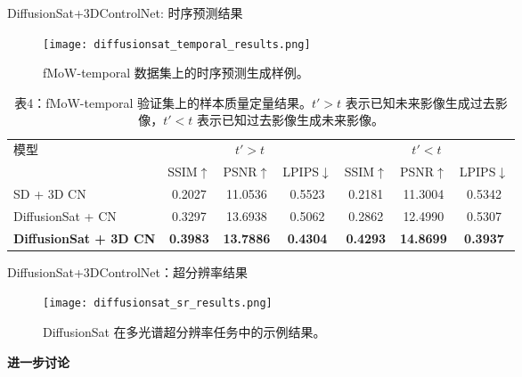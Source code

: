 \begin{refsection}
  \begin{frame}{DiffusionSat+3DControlNet: 时序预测结果}
    \begin{figure}
      \centering
      \texttt{[image: diffusionsat\_temporal\_results.png]}
      \caption[]{\scriptsize fMoW-temporal 数据集上的时序预测生成样例。~\parencite{diffusionset2024}}
    \end{figure}
    \begin{table}[h]
      \centering
      \scriptsize
      \begin{tabular}{l|ccc|ccc}
        \toprule
        \multirow{2}{*}{模型} & \multicolumn{3}{c|}{$t' > t$} & \multicolumn{3}{c}{$t' < t$} \\
        & SSIM$\uparrow$ & PSNR$\uparrow$ & LPIPS$\downarrow$ & SSIM$\uparrow$ & PSNR$\uparrow$ & LPIPS$\downarrow$ \\
        \midrule
        SD + 3D CN & 0.2027 & 11.0536 & 0.5523 & 0.2181 & 11.3004 & 0.5342 \\
        DiffusionSat + CN & 0.3297 & 13.6938 & 0.5062 & 0.2862 & 12.4990 & 0.5307 \\
        \textbf{DiffusionSat + 3D CN} & \textbf{0.3983} & \textbf{13.7886} & \textbf{0.4304} & \textbf{0.4293} & \textbf{14.8699} & \textbf{0.3937} \\
        \bottomrule
      \end{tabular}
      \caption[]{\scriptsize 表4：fMoW-temporal 验证集上的样本质量定量结果。$t' > t$ 表示已知未来影像生成过去影像，$t' < t$ 表示已知过去影像生成未来影像。}
    \end{table}
    \bottomleftrefs
  \end{frame}
\end{refsection}

\begin{refsection}
  \begin{frame}{DiffusionSat+3DControlNet：超分辨率结果}
    \begin{figure}
      \centering
      \texttt{[image: diffusionsat\_sr\_results.png]}
      \caption[]{\scriptsize DiffusionSat 在多光谱超分辨率任务中的示例结果。~\parencite{diffusionset2024}}
    \end{figure}
    \bottomleftrefs
  \end{frame}
\end{refsection}


\begin{refsection}
  \begin{frame}
    \centering
    \vspace{2.5cm}
    {\LARGE \textbf{进一步讨论}}
  \end{frame}
\end{refsection}

